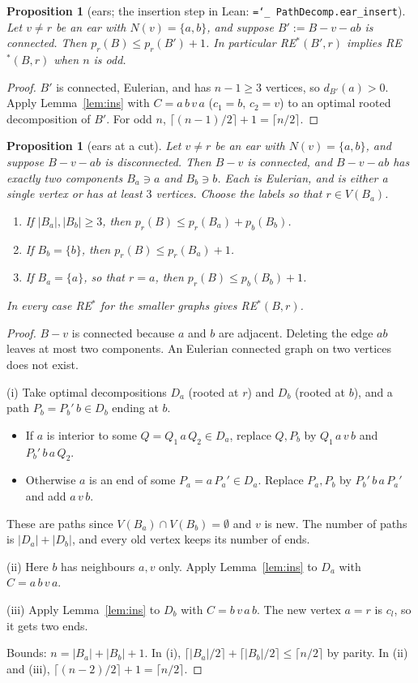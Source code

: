 \documentclass[11pt]{amsart}
\newtheorem{proposition}[theorem]{Proposition}
\theoremstyle{definition}
\newcommand{\pr}{p_r}
\newcommand{\lean}[1]{\texttt{\hyphenchar\font=`\_ #1}}
\begin{document}
\begin{proposition}[ears; the insertion step in Lean: \lean{PathDecomp.ear\_insert}]\label{prop:ear}
Let $v\ne r$ be an ear with $N(v)=\{a,b\}$, and suppose $B':=B-v-ab$ is connected. Then
$\pr(B)\le\pr(B')+1$. In particular RE$^*(B',r)$ implies RE$^*(B,r)$ when $n$ is odd.
\end{proposition}

\begin{proof}
$B'$ is connected, Eulerian, and has $n-1\ge3$ vertices, so $d_{B'}(a)>0$. Apply Lemma~\ref{lem:ins} with
$C=a\,b\,v\,a$ ($c_1=b$, $c_2=v$) to an optimal rooted decomposition of $B'$. For odd $n$,
$\lceil (n-1)/2\rceil+1=\lceil n/2\rceil$.
\end{proof}

\begin{proposition}[ears at a cut]\label{prop:earcut}
Let $v\ne r$ be an ear with $N(v)=\{a,b\}$, and suppose $B-v-ab$ is disconnected. Then $B-v$ is
connected, and $B-v-ab$ has exactly two components $B_a\ni a$ and $B_b\ni b$. Each is Eulerian, and is
either a single vertex or has at least $3$ vertices. Choose the labels so that $r\in V(B_a)$.
\begin{enumerate}[label=(\roman*)]
\item If $|B_a|,|B_b|\ge3$, then $\pr(B)\le p_r(B_a)+p_b(B_b)$.
\item If $B_b=\{b\}$, then $\pr(B)\le p_r(B_a)+1$.
\item If $B_a=\{a\}$, so that $r=a$, then $\pr(B)\le p_b(B_b)+1$.
\end{enumerate}
In every case RE$^*$ for the smaller graphs gives RE$^*(B,r)$.
\end{proposition}

\begin{proof}
$B-v$ is connected because $a$ and $b$ are adjacent. Deleting the edge $ab$ leaves at most two
components. An Eulerian connected graph on two vertices does not exist.

(i) Take optimal decompositions $D_a$ (rooted at $r$) and $D_b$ (rooted at $b$), and a path $P_b=P_b'\,b\in
D_b$ ending at $b$.
\begin{itemize}[leftmargin=*]
\item If $a$ is interior to some $Q=Q_1\,a\,Q_2\in D_a$, replace $Q,P_b$ by $Q_1\,a\,v\,b$ and
$P_b'\,b\,a\,Q_2$.
\item Otherwise $a$ is an end of some $P_a=a\,P_a'\in D_a$. Replace $P_a,P_b$ by $P_b'\,b\,a\,P_a'$ and
add $a\,v\,b$.
\end{itemize}
These are paths since $V(B_a)\cap V(B_b)=\emptyset$ and $v$ is new. The number of paths is
$|D_a|+|D_b|$, and every old vertex keeps its number of ends.

(ii) Here $b$ has neighbours $a,v$ only. Apply Lemma~\ref{lem:ins} to $D_a$ with $C=a\,b\,v\,a$.

(iii) Apply Lemma~\ref{lem:ins} to $D_b$ with $C=b\,v\,a\,b$. The new vertex $a=r$ is $c_l$, so it gets
two ends.

Bounds: $n=|B_a|+|B_b|+1$. In (i), $\lceil|B_a|/2\rceil+\lceil|B_b|/2\rceil\le\lceil n/2\rceil$ by
parity. In (ii) and (iii), $\lceil (n-2)/2\rceil+1=\lceil n/2\rceil$.
\end{proof}
\end{document}
